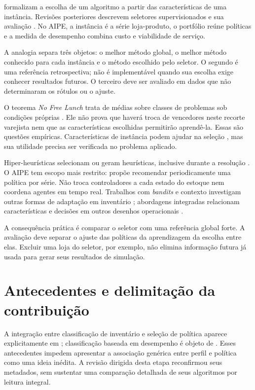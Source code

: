 \citet{Rice1976AlgorithmSelection} formalizam a escolha de um algoritmo a partir das características de uma instância. Revisões posteriores descrevem seletores supervisionados e sua avaliação \citep{Kotthoff2014AlgorithmSelection,Kerschke2019AutomatedAlgorithmSelection}. No AIPE, a instância é a série loja-produto, o portfólio reúne políticas e a medida de desempenho combina custo e viabilidade de serviço.

A analogia separa três objetos: o melhor método global, o melhor método conhecido para cada instância e o método escolhido pelo seletor. O segundo é uma referência retrospectiva; não é implementável quando sua escolha exige conhecer resultados futuros. O terceiro deve ser avaliado em dados que não determinaram os rótulos ou o ajuste.

O teorema \textit{No Free Lunch} trata de médias sobre classes de problemas sob condições próprias \citep{Wolpert1997NoFreeLunch}. Ele não prova que haverá troca de vencedores neste recorte varejista nem que as características escolhidas permitirão aprendê-la. Essas são questões empíricas. Características de instância podem ajudar na seleção \citep{Kerschke2019ELASelection}, mas sua utilidade precisa ser verificada no problema aplicado.

Hiper-heurísticas selecionam ou geram heurísticas, inclusive durante a resolução \citep{Drake2020SelectionHyperHeuristics,Dokeroglu2024HyperHeuristics}. O AIPE tem escopo mais restrito: propõe recomendar periodicamente uma política por série. Não troca controladores a cada estado do estoque nem coordena agentes em tempo real. Trabalhos com \textit{bandits} e contexto investigam outras formas de adaptação em inventário \citep{Preil2022BanditInventory,ContextualRL2024SupplyChain}; abordagens integradas relacionam características e decisões em outros desenhos operacionais \citep{Qi2023EndToEndInventory}.

A consequência prática é comparar o seletor com uma referência global forte. A avaliação deve separar o ajuste das políticas da aprendizagem da escolha entre elas. Excluir uma loja do seletor, por exemplo, não elimina informação futura já usada para gerar seus resultados de simulação.

\section{Antecedentes e delimitação da contribuição}

A integração entre classificação de inventário e seleção de política aparece explicitamente em \citet{Mohammaditabar2012Integrated}; classificação baseada em desempenho é objeto de \citet{SheikhZadeh2021PBIC}. Esses antecedentes impedem apresentar a associação genérica entre perfil e política como uma ideia inédita. A revisão dirigida desta etapa reconfirmou seus metadados, sem sustentar uma comparação detalhada de seus algoritmos por leitura integral.

